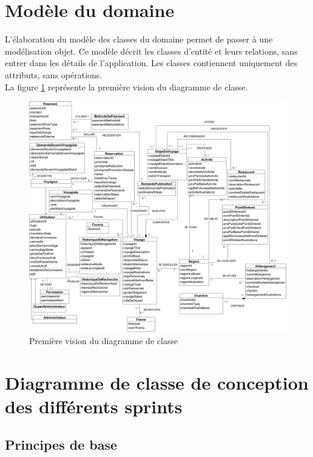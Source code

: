 \documentclass[12pt]{report}
\begin{document}
			\section{Modèle du domaine}

			\hspace{15pt} L'élaboration du modèle des classes du domaine permet de passer à une modélisation objet. Ce modèle décrit les classes d'entité et leurs relations, sans entrer dans les détails de l'application. Les classes contiennent uniquement des attributs, sans opérations.\\


			La figure \ref{fig:DCGlobal} représente la première vision du diagramme de classe.

			\begin{figure}[h]
				\centering
				\includegraphics[width=\textwidth]{generalDC.jpg}
				\caption{Première vision du diagramme de classe}
				\label{fig:DCGlobal}
			\end{figure}
			\clearpage


			\section{Diagramme de classe de conception des différents sprints}
				\subsection{Principes de base}
				
\end{document}
